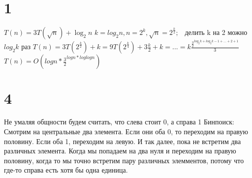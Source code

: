 


\section*{1}
$T(n) = 3T(\sqrt{n}) + \log_2 n$ \newline
$k = log_2 n, n = 2^k, \sqrt{n} = 2^{\frac{k}{2}};$ \ делить k на 2 можно $log_2 k$ раз \newline
$T(n) = 3T(2^{\frac{k}{2}}) + k = 9T(2^{\frac{k}{4}}) + 3\frac{k}{2} + k = ... = k\frac{\frac{3}{2}^{log_2 k + log_2 k-1 + ... + 2 + 1}}{3}$
\newline
$T(n) = O(logn * \frac{3}{2}^{logn * loglogn})$

\section*{4}
Не умаляя общности будем считать, что слева стоит 0, а справа 1\newline
Бинпоиск: \newline
Смотрим на центральные два элемента. Если они оба 0, то переходим на правую половину. Если оба 1, переходим на левую. И так далее, пока не встретим два различных элемента.\newline
Когда мы попадаем на два нуля и переходим на правую половину, когда то мы точно встретим пару различных элемментов, потому что где-то справа есть хотя бы одна единица.









